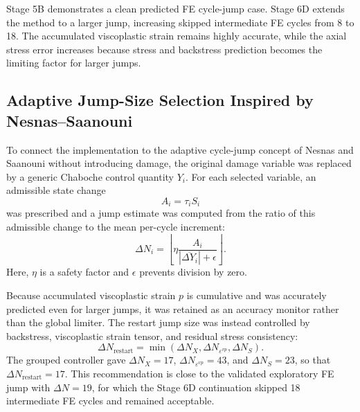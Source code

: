\begin{table}[htbp]
\centering
\small
{}
\caption{Stage 6D larger predicted-state FE cycle-jump result. The comparison used an interpolated exact-time cycle-30 reference from the 50-cycle Abaqus ODB.}
\label{tab:stage6d_predicted_fe_jump}
\end{table}

Stage 5B demonstrates a clean predicted FE cycle-jump case. Stage 6D extends the method to a larger jump, increasing skipped intermediate FE cycles from 8 to 18. The accumulated viscoplastic strain remains highly accurate, while the axial stress error increases because stress and backstress prediction becomes the limiting factor for larger jumps.

\subsection{Adaptive Jump-Size Selection Inspired by Nesnas--Saanouni}

To connect the implementation to the adaptive cycle-jump concept of Nesnas and Saanouni without introducing damage, the original damage variable was replaced by a generic Chaboche control quantity \(Y_i\). For each selected variable, an admissible state change
\begin{equation}
A_i = \tau_i S_i
\end{equation}
was prescribed and a jump estimate was computed from the ratio of this admissible change to the mean per-cycle increment:
\begin{equation}
\Delta N_i =
\left\lfloor
\eta
\frac{A_i}{|\overline{\Delta Y_i}|+\epsilon}
\right\rfloor .
\end{equation}
Here, \(\eta\) is a safety factor and \(\epsilon\) prevents division by zero.

Because accumulated viscoplastic strain \(p\) is cumulative and was accurately predicted even for larger jumps, it was retained as an accuracy monitor rather than the global limiter. The restart jump size was instead controlled by backstress, viscoplastic strain tensor, and residual stress consistency:
\begin{equation}
\Delta N_{\mathrm{restart}} =
\min\left(\Delta N_X,\Delta N_{\varepsilon^{vp}},\Delta N_S\right).
\end{equation}
The grouped controller gave \(\Delta N_X=17\), \(\Delta N_{\varepsilon^{vp}}=43\), and \(\Delta N_S=23\), so that \(\Delta N_{\mathrm{restart}}=17\). This recommendation is close to the validated exploratory FE jump with \(\Delta N=19\), for which the Stage 6D continuation skipped 18 intermediate FE cycles and remained acceptable.

